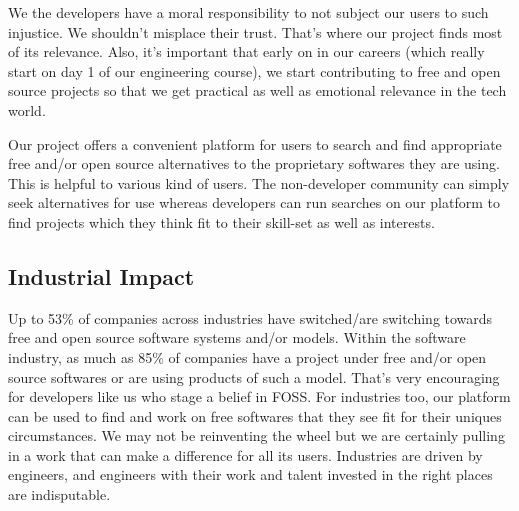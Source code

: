 We the developers have a moral responsibility to not subject our users to such injustice. We shouldn’t misplace their trust. That’s where our project finds most of its relevance. Also, it’s important that early on in our careers (which really start on day 1 of our engineering course), we start contributing to free and open source projects so that we get practical as well as emotional relevance in the tech world.

Our project offers a convenient platform for users to search and find appropriate free and/or open source alternatives to the proprietary softwares they are using. This is helpful to various kind of users. The non-developer community can simply seek alternatives for use whereas developers can run searches on our platform to find projects which they think fit to their skill-set as well as interests.

\subsection{Industrial Impact}
Up to 53\% of companies across industries have switched/are switching towards free and open source software systems and/or models. Within the software industry, as much as 85\% of companies have a project under free and/or open source softwares or are using products of such a model. That’s very encouraging for developers like us who stage a belief in FOSS. For industries too, our platform can be used to find and work on free softwares that they see fit for their uniques circumstances. We may not be reinventing the wheel but we are certainly pulling in a work that can make a difference for all its users. Industries are driven by engineers, and engineers with their work and talent invested in the right places are indisputable.


